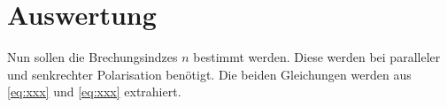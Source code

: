 \section{Auswertung}
\label{sec:Auswertung}

Nun sollen die Brechungsindzes $n$ bestimmt werden.
Diese werden bei paralleler und senkrechter Polarisation benötigt.
Die beiden Gleichungen werden aus \autoref{eq:xxx} und \autoref{eq:xxx} extrahiert.


\subsection{}